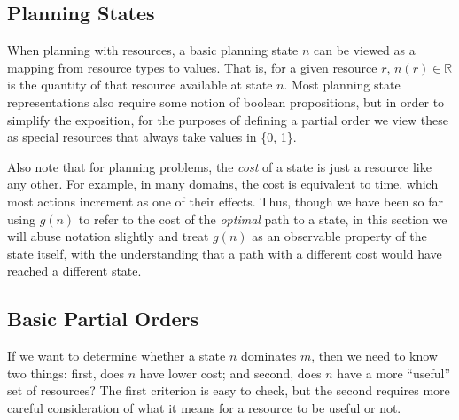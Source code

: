 \documentclass[letterpaper]{article}
\theoremstyle{plain} \newtheorem{theorem}{Theorem} \newtheorem{proposition}{Proposition} \newtheorem{lemma}{Lemma}
\theoremstyle{definition} \newtheorem{definition}{Definition} \newtheorem{conjecture}{Conjecture} \newtheorem*{example}{Example}
\theoremstyle{remark} \newtheorem*{remark}{Remark} \newtheorem*{note}{Note} \newtheorem{case}{Case}
\newcommand{\R}{\mathbb{R}}
\begin{document}
\subsection{Planning States}

When planning with resources, a basic planning state $n$ can be viewed as a mapping from
resource types to values. That is, for a given resource $r$, $n(r) \in \R$ is the quantity
of that resource available at state $n$. Most planning state representations also require
some notion of boolean propositions, but in order to simplify the exposition, for the
purposes of defining a partial order we view these as special resources that always take
values in \{0, 1\}.

Also note that for planning problems, the \emph{cost} of a state is
just a resource like any other. For example, in many domains, the cost is equivalent to
time, which most actions increment as one of their effects. Thus, though we have been so
far using $g(n)$ to refer to the cost of the \emph{optimal} path to a state, in this
section we will abuse notation slightly and treat $g(n)$ as an observable property of the
state itself, with the understanding that a path with a different cost would have reached a
different state.

\subsection{Basic Partial Orders}

If we want to determine whether a state $n$ dominates $m$, then we need
to know two things: first, does $n$ have lower cost; and second, does $n$
have a more ``useful'' set of resources? The first criterion is easy to check, but the
second requires more careful consideration of what it means for a resource to be useful or not.
\end{document}

